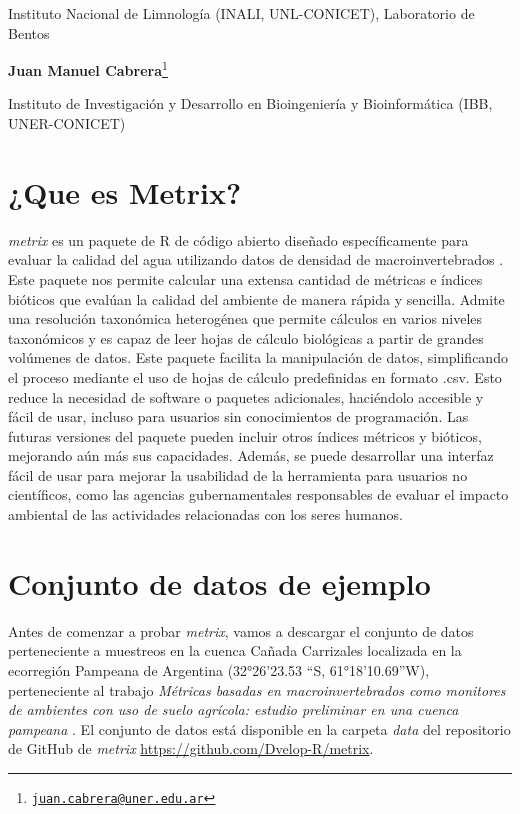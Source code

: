 \documentclass[
]{book}
\begin{document}
Instituto Nacional de Limnología (INALI, UNL-CONICET), Laboratorio de Bentos

\textbf{Juan Manuel Cabrera}\footnote{\href{mailto:juan.cabrera@uner.edu.ar}{\nolinkurl{juan.cabrera@uner.edu.ar}}}

Instituto de Investigación y Desarrollo en Bioingeniería y Bioinformática (IBB, UNER-CONICET)

\hypertarget{que-es-metrix}{%
\section{¿Que es Metrix?}\label{que-es-metrix}}

\emph{metrix} es un paquete de R de código abierto diseñado específicamente para evaluar la calidad del agua utilizando datos de densidad de macroinvertebrados \citep{cabrera2023}.
Este paquete nos permite calcular una extensa cantidad de métricas e índices bióticos que evalúan la calidad del ambiente de manera rápida y sencilla.
Admite una resolución taxonómica heterogénea que permite cálculos en varios niveles taxonómicos y es capaz de leer hojas de cálculo biológicas a partir de grandes volúmenes de datos.
Este paquete facilita la manipulación de datos, simplificando el proceso mediante el uso de hojas de cálculo predefinidas en formato .csv.
Esto reduce la necesidad de software o paquetes adicionales, haciéndolo accesible y fácil de usar, incluso para usuarios sin conocimientos de programación.
Las futuras versiones del paquete pueden incluir otros índices métricos y bióticos, mejorando aún más sus capacidades.
Además, se puede desarrollar una interfaz fácil de usar para mejorar la usabilidad de la herramienta para usuarios no científicos, como las agencias gubernamentales responsables de evaluar el impacto ambiental de las actividades relacionadas con los seres humanos.

\hypertarget{conjunto-de-datos-de-ejemplo}{%
\section{Conjunto de datos de ejemplo}\label{conjunto-de-datos-de-ejemplo}}

Antes de comenzar a probar \emph{metrix}, vamos a descargar el conjunto de datos perteneciente a muestreos en la cuenca Cañada Carrizales localizada en la ecorregión Pampeana de Argentina (32°26'23.53 ``S, 61°18'10.69''W), perteneciente al trabajo \emph{Métricas basadas en macroinvertebrados como monitores de ambientes con uso de suelo agrícola: estudio preliminar en una cuenca pampeana} \citep{capeletti2019}.
El conjunto de datos está disponible en la carpeta \emph{data} del repositorio de GitHub de \emph{metrix} \url{https://github.com/Dvelop-R/metrix}.
\end{document}
